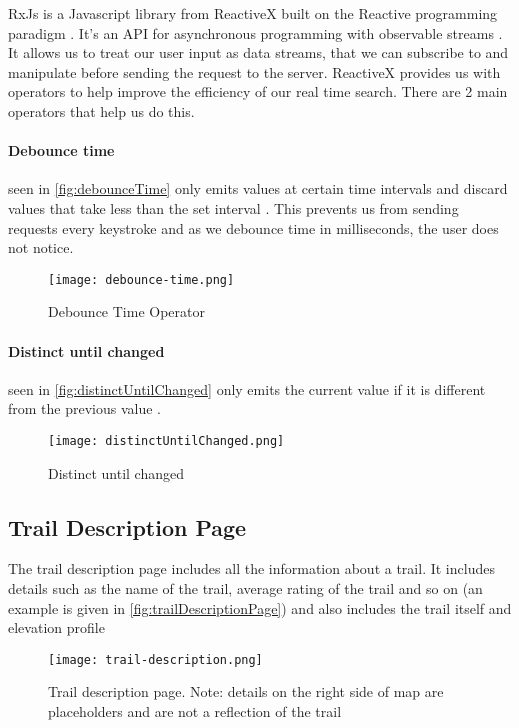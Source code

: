 RxJs is a Javascript library from ReactiveX built on the Reactive programming paradigm \cite{wan2000functional}. It's an API for asynchronous programming with observable streams \cite{reactivex2018main}. It allows us to treat our user input as data streams, that we can subscribe to and manipulate before sending the request to the server. ReactiveX provides us with operators to help improve the efficiency of our real time search. There are 2 main operators that help us do this.

\paragraph{Debounce time} seen in \autoref{fig:debounceTime} only emits values at certain time intervals and discard values that take less than the set interval \cite{leanrrxjs2019debounce}. This prevents us from sending requests every keystroke and as we debounce time in milliseconds, the user does not notice.

\begin{figure}[htb!]
    \centering
    \texttt{[image: debounce-time.png]}
    \caption{Debounce Time Operator}
    \label{fig:debounceTime}
\end{figure}

\paragraph{Distinct until changed} seen in \autoref{fig:distinctUntilChanged} only emits the current value if it is different from the previous value \cite{leanrrxjs2019distinct}.
\begin{figure}[htb!]
    \centering
    \texttt{[image: distinctUntilChanged.png]}
    \caption{Distinct until changed}
    \label{fig:distinctUntilChanged}
\end{figure}

\subsection{Trail Description Page} \label{subsec:trailDescription}
The trail description page includes all the information about a trail. It includes details such as the name of the trail, average rating of the trail and so on (an example is given in \autoref{fig:trailDescriptionPage}) and also includes the trail itself and elevation profile

\begin{figure}[htb!]
    \centering
    \texttt{[image: trail-description.png]}
    \caption{Trail description page. Note: details on the right side of map are placeholders and are not a reflection of the trail}
    \label{fig:trailDescriptionPage}
\end{figure}

